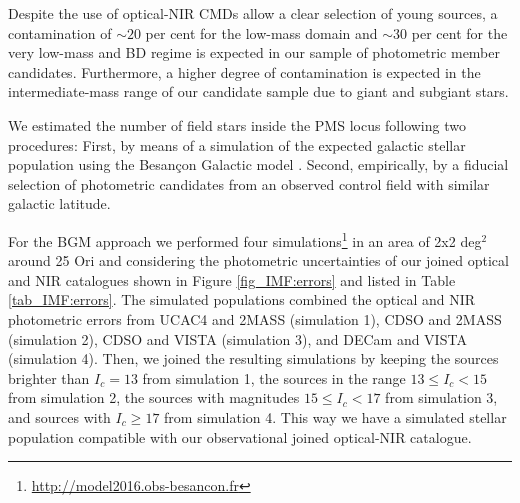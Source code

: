 \documentclass[12pt]{article}
\newcounter{subsubsubsection}[subsubsection]
\begin{document}
\label{sec_IMF:fieldcontam}

Despite the use of optical-NIR CMDs allow a clear selection of young sources, a contamination of $\sim20$ per cent for the low-mass domain \citep{Downes2014} and $\sim30$ per cent for the very low-mass and BD regime \citep{Downes2015} is expected in our sample of photometric member candidates. Furthermore, a higher degree of contamination is expected in the intermediate-mass range of our candidate sample due to giant and subgiant stars.

We estimated the number of field stars inside the PMS locus following two procedures: First, by means of a simulation of the expected galactic stellar population using the Besan\c{c}on Galactic model \citep[hereafter \ac{BGM}; ][]{Robin2003}. Second, empirically, by a fiducial selection of photometric candidates from an observed control field with similar galactic latitude.

For the BGM approach we performed four simulations\footnote{\url{http://model2016.obs-besancon.fr}} in an area of 2x2 deg$^2$ around 25 Ori and considering the photometric uncertainties of our joined optical and NIR catalogues shown in Figure \ref{fig_IMF:errors} and listed in Table \ref{tab_IMF:errors}. The simulated populations combined the optical and NIR photometric errors from UCAC4 and 2MASS (simulation 1), CDSO and 2MASS (simulation 2), CDSO and VISTA (simulation 3), and DECam and VISTA (simulation 4). Then, we joined the resulting simulations by keeping the sources brighter than $I_c=13$ from simulation 1, the sources in the range $13 \le I_c<15$ from simulation 2, the sources with magnitudes $15 \le I_c<17$ from simulation 3, and sources with $I_c \ge 17$ from simulation 4. This way we have a simulated stellar population compatible with our observational joined optical-NIR catalogue.
\end{document}
